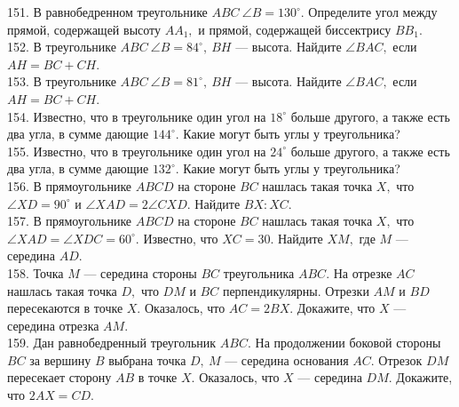 \documentclass[12pt]{article}
\begin{document}
151. В равнобедренном треугольнике $ABC\ \angle B = 130^\circ.$ Определите угол между прямой, содержащей высоту $AA_1,$ и прямой, содержащей биссектрису $BB_1.$\\
152. В треугольнике $ABC\ \angle B = 84^\circ,\ BH$ --- высота. Найдите $\angle BAC,$ если $AH=BC+CH.$\\
153. В треугольнике $ABC\ \angle B = 81^\circ,\ BH$ --- высота. Найдите $\angle BAC,$ если $AH=BC+CH.$\\
154. Известно, что в треугольнике один угол на $18^\circ$ больше другого, а также есть два угла, в сумме дающие $144^\circ.$ Какие могут быть углы у треугольника?\\
155. Известно, что в треугольнике один угол на $24^\circ$ больше другого, а также есть два угла, в сумме дающие $132^\circ.$ Какие могут быть углы у треугольника?\\
156. В прямоугольнике $ABCD$ на стороне $BC$ нашлась такая точка $X,$ что $\angle XD = 90^\circ$ и $\angle XAD =2\angle CXD.$ Найдите $BX : XC.$\\
157. В прямоугольнике $ABCD$ на стороне $BC$ нашлась такая точка $X,$ что $\angle XAD = \angle XDC = 60^\circ.$ Известно, что $XC = 30.$ Найдите $XM,$ где $M$ — середина $AD.$\\
158. Точка $M$ --- середина стороны $BC$ треугольника $ABC.$ На отрезке $AC$ нашлась такая точка $D,$ что $DM$ и $BC$ перпендикулярны. Отрезки $AM$ и $BD$ пересекаются в точке $X.$ Оказалось, что
$AC = 2BX.$ Докажите, что $X$ --- середина отрезка $AM.$\\
159. Дан равнобедренный треугольник $ABC.$ На продолжении боковой стороны $BC$ за вершину $B$ выбрана точка $D,\ M$ --- середина основания $AC.$
Отрезок $DM$ пересекает сторону $AB$ в точке $X.$ Оказалось, что $X$ --- середина $DM.$ Докажите, что $2AX = CD.$
\newpage
\end{document}
